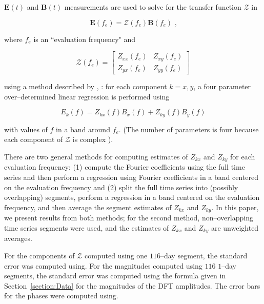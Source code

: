 \documentclass[draft,linenumbers]{agujournal2018}
\newcommand{\citeay}[1]{%
\citeauthor{#1}, \citeyear{#1}%
}
\begin{document}
$\mathbf{E}(t)$ and $\mathbf{B}(t)$ measurements are used to solve for the transfer function $\boldsymbol{\mathcal{Z}}$ in

\begin{linenomath*}
    \begin{equation}
        \mathbf{E}(f_e) = \boldsymbol{\mathcal{
    Z}}(f_e)\mathbf{B}(f_e)\text{ ,}
    \end{equation}
\end{linenomath*}

\noindent where $f_e$ is an ``evaluation frequency" and
    
\begin{linenomath*}
    \begin{equation}
        \boldsymbol{\mathcal{Z}}(f_e) = 
            \begin{bmatrix}
                Z_{xx}(f_e) & Z_{xy}(f_e)\\
                Z_{yx}(f_e) & Z_{yy}(f_e)
            \end{bmatrix}
    \end{equation}
\end{linenomath*}

\noindent using a method described by \citeay{Sims1971}: for each component $k=x,y$, a four parameter over--determined linear regression is performed using

\begin{equation}
E_k(f) = Z_{kx}(f)B_x(f) + Z_{ky}(f)B_y(f)
\end{equation}

\noindent with values of $f$ in a band around $f_e$. (The number of parameters is four because each component of $\boldsymbol{\mathcal{Z}}$ is complex \citep{Egbert1986}).

There are two general methods for computing estimates of $Z_{kx}$ and $Z_{ky}$ for each evaluation frequency: (1) compute the Fourier coefficients using the full time series and then perform a regression using Fourier coefficients in a band centered on the evaluation frequency and (2) split the full time series into (possibly overlapping) segments, perform a regression in a band centered on the evaluation frequency, and then average the segment estimates of $Z_{kx}$ and $Z_{ky}$. In this paper, we present results from both methods; for the second method, non--overlapping time series segments were used, and the estimates of $Z_{kx}$ and $Z_{ky}$ are unweighted averages. 

For the components of $\boldsymbol{\mathcal{Z}}$ computed using one $116$--day segment, the standard error was computed using\todo{}. For the magnitudes computed using $116$ $1$--day segments, the standard error was computed using the formula given in Section~\ref{section:Data} for the magnitudes of the DFT amplitudes. The error bars for the phases were computed using\todo{}.
\end{document}
